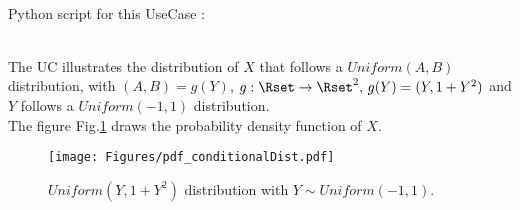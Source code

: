 \textspace\\
Python script for this UseCase :


\textspace\\

The UC illustrates the distribution of  $X$ that follows a $Uniform(A,B)$ distribution, with $(A,B)=g(Y)$, $g:\Rset \rightarrow \Rset^2, \, g(Y)=(Y, 1+Y^2)$ and $Y$ follows a $Uniform(-1, 1)$ distribution.\\
The figure Fig.\ref{ConditionalPDF} draws the probability density function of $X$.


\begin{figure}[H]
  \begin{center}
    \texttt{[image: Figures/pdf\_conditionalDist.pdf]}
    \caption{$Uniform(Y, 1+Y^2)$ distribution with $Y\sim Uniform(-1,1)$.}
    \label{ConditionalPDF}
  \end{center}
\end{figure}
